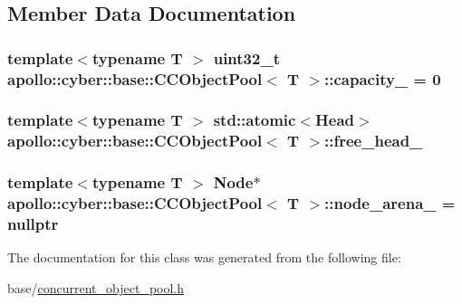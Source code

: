 \subsection{Member Data Documentation}
\hypertarget{classapollo_1_1cyber_1_1base_1_1CCObjectPool_a3aaed740b510502df0ac4190b8e1734f}{
\subsubsection[{capacity\-\_\-}]{\setlength{\rightskip}{0pt plus 5cm}template$<$typename T $>$ uint32\-\_\-t {\bf apollo\-::cyber\-::base\-::\-C\-C\-Object\-Pool}$<$ T $>$\-::capacity\-\_\- = 0\hspace{0.3cm}{\ttfamily [private]}}}\label{classapollo_1_1cyber_1_1base_1_1CCObjectPool_a3aaed740b510502df0ac4190b8e1734f}
\hypertarget{classapollo_1_1cyber_1_1base_1_1CCObjectPool_a40fd41481676d2e6ddac5d3237e7f234}{
\subsubsection[{free\-\_\-head\-\_\-}]{\setlength{\rightskip}{0pt plus 5cm}template$<$typename T $>$ std\-::atomic$<${\bf Head}$>$ {\bf apollo\-::cyber\-::base\-::\-C\-C\-Object\-Pool}$<$ T $>$\-::free\-\_\-head\-\_\-\hspace{0.3cm}{\ttfamily [private]}}}\label{classapollo_1_1cyber_1_1base_1_1CCObjectPool_a40fd41481676d2e6ddac5d3237e7f234}
\hypertarget{classapollo_1_1cyber_1_1base_1_1CCObjectPool_ad5fdd44b05eac5aa18d54fdec5928dfb}{
\subsubsection[{node\-\_\-arena\-\_\-}]{\setlength{\rightskip}{0pt plus 5cm}template$<$typename T $>$ {\bf Node}$\ast$ {\bf apollo\-::cyber\-::base\-::\-C\-C\-Object\-Pool}$<$ T $>$\-::node\-\_\-arena\-\_\- = nullptr\hspace{0.3cm}{\ttfamily [private]}}}\label{classapollo_1_1cyber_1_1base_1_1CCObjectPool_ad5fdd44b05eac5aa18d54fdec5928dfb}


The documentation for this class was generated from the following file\-:\begin{DoxyCompactItemize}
\item 
base/\hyperlink{concurrent__object__pool_8h}{concurrent\-\_\-object\-\_\-pool.\-h}\end{DoxyCompactItemize}
